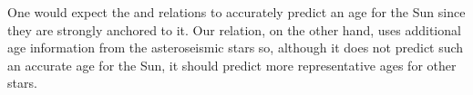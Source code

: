 \documentclass[useAMS, usenatbib]{mn2e}
\begin{document}

One would expect the \citet{Barnes2007} and \citet{Mamajek2008} relations to
accurately predict an age for the Sun since they are strongly anchored to it.
Our relation, on the other hand, uses additional age information from the
asteroseismic stars so, although it does not predict such an accurate age for
the Sun, it should predict more representative ages for other stars.
\end{document}
